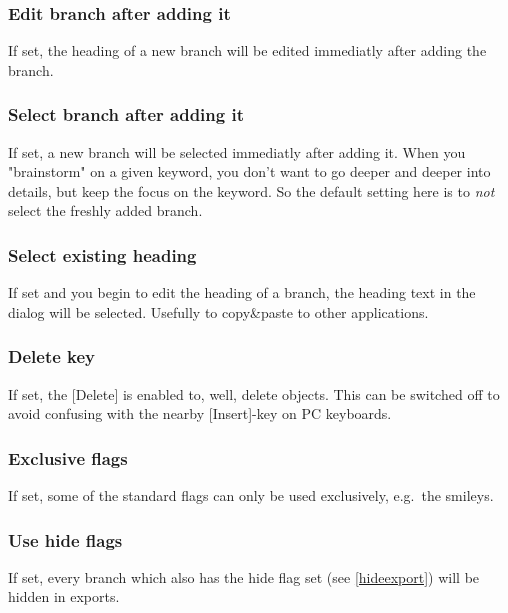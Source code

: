 \documentclass[12pt,a4paper]{article}
\newcommand{\key}[1]{[#1]}
\begin{document}
\begin{appendix}
\subsubsection*{Edit branch after adding it}
	If set, the heading of a new branch will be edited immediatly after
	adding the branch.

\subsubsection*{Select branch after adding it}
	If set, a new branch will be selected immediatly after adding it.
	When you "brainstorm" on a given keyword, you don't want to go
	deeper and deeper into details, but keep the focus on the keyword.
	So the default setting here is to {\em not} select the freshly added
	branch.
	
\subsubsection*{Select existing heading}
	If set and you begin to edit the heading of a branch, the heading text in
	the dialog will be selected. Usefully to copy\&paste to other
	applications.

\subsubsection*{Delete key}
	If set, the \key{Delete} is enabled to, well, delete objects. This
	can be switched off to avoid confusing with the nearby
	\key{Insert}-key on PC keyboards.

\subsubsection*{Exclusive flags}
	If set, some of the standard flags can only be used exclusively,
	e.g.~the smileys.

\subsubsection*{Use hide flags}
	If set, every branch which also has the hide flag set (see
	\ref{hideexport}) will be hidden in exports.


\end{appendix}
\end{document}
